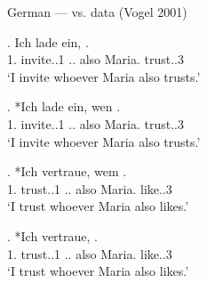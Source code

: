 \documentclass[xcolor=dvipsnames,10pt]{beamer}
\begin{document}
\begin{frame}{German ---  vs.  data (Vogel 2001)}

\exg. Ich {lade ein},    . \\
1.{} invite..1\textcolor{LimeGreen}{\scsub{[acc]}} ..\textcolor{red}{} also Maria.{} trust..3\textcolor{red}{\scsub{[dat]}}\\
`I invite whoever Maria also trusts.'



\exg. *Ich {lade ein}, wen   . \\
1.{} invite..1\textcolor{LimeGreen}{\scsub{[acc]}} ..\textcolor{LimeGreen}{} also Maria.{} trust..3\textcolor{red}{\scsub{[dat]}}\\
`I invite whoever Maria also trusts.'



\exg. *Ich vertraue, wem   . \\
1.{} trust..1\textcolor{red}{\scsub{[dat]}} ..\textcolor{red}{} also Maria.{} like..3\textcolor{LimeGreen}{\scsub{[acc]}}\\
`I trust whoever Maria also likes.'



\exg. *Ich vertraue,    . \\
1.{} trust..1\textcolor{red}{\scsub{[dat]}} ..\textcolor{LimeGreen}{} also Maria.{} like..3\textcolor{LimeGreen}{\scsub{[acc]}}\\
`I trust whoever Maria also likes.'

\end{frame}
\end{document}
